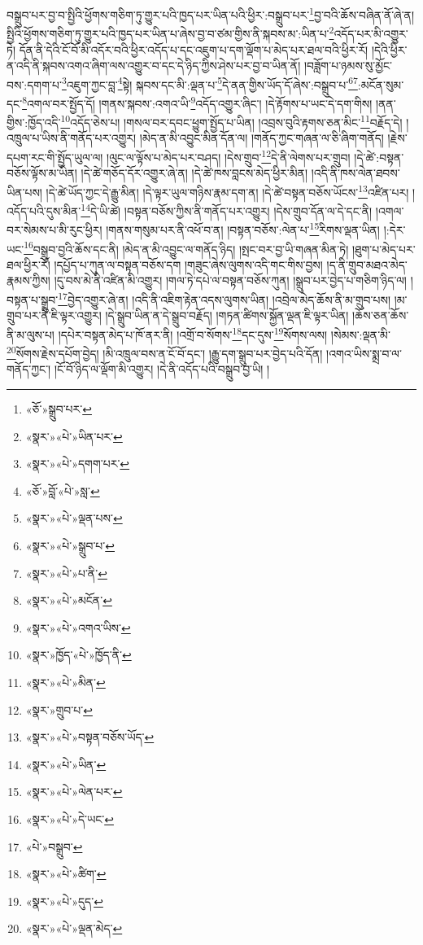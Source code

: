 བསྒྲུབ་པར་བྱ་བ་སྤྱིའི་ཕྱོགས་གཅིག་ཏུ་གྱུར་པའི་ཁྱད་པར་ཡིན་པའི་ཕྱིར་:བསྒྲུབ་པར་\footnote{«ཅོ་»སྒྲུབ་པར་}བྱ་བའི་ཆོས་བཞིན་ནོ་ཞེ་ན། སྤྱིའི་ཕྱོགས་གཅིག་ཏུ་གྱུར་པའི་ཁྱད་པར་ཡིན་པ་ཞེས་བྱ་བ་ཙམ་གྱིས་ནི་སྐབས་མ་:ཡིན་པ་\footnote{«སྣར་»«པེ་»ཡིན་པར་}འདོད་པར་མི་འགྱུར་ཏེ། དོན་ནི་དེའི་ངོ་བོ་མི་འདོར་བའི་ཕྱིར་འདོད་པ་དང་འཇུག་པ་དག་ལྡོག་པ་མེད་པར་ཐལ་བའི་ཕྱིར་རོ། །དེའི་ཕྱིར་ན་འདི་ནི་སྐབས་འགའ་ཞིག་ལས་འགྱུར་བ་དང་དེ་ཉིད་ཀྱིས་ཤེས་པར་བྱ་བ་ཡིན་ནོ། །བཟློག་པ་ཉམས་སུ་མྱོང་བས་:དགག་པ་\footnote{«སྣར་»«པེ་»དགག་པར་}འཇུག་ཀྱང་བླ་\footnote{«ཅོ་»བློ་«པེ་»སླ་}སྟེ། སྐབས་དང་མི་:ལྡན་པ་\footnote{«སྣར་»«པེ་»ལྡན་པས་}དེ་ནན་གྱིས་ཡོད་དོ་ཞེས་:བསྒྲུབ་པ་\footnote{«སྣར་»«པེ་»སྒྲུབ་པ་}\footnote{«སྣར་»«པེ་»པ་ནི་}:མངོན་སུམ་དང་\footnote{«སྣར་»«པེ་»མངོན་}འགལ་བར་སྤྱོད་དོ། །གནས་སྐབས་:འགའ་ཡི་\footnote{«སྣར་»«པེ་»འགའ་ཡིས་}འདོད་འགྱུར་ཞིང་། །དེ་རྟོགས་པ་ཡང་དེ་དག་གིས། །ནན་གྱིས་:ཁྱོད་འདི་\footnote{«སྣར་»ཁྱོད་«པེ་»ཁྱོད་ནི་}འདོད་ཅེས་པ། །གསལ་བར་དབང་ཕྱུག་སྤྱོད་པ་ཡིན། །འབྲས་བུའི་རྟགས་ཅན་མིང་\footnote{«སྣར་»«པེ་»མིན་}བརྗོད་དེ། །འཁྲུལ་པ་ཡིས་ནི་གནོད་པར་འགྱུར། །མེད་ན་མི་འབྱུང་མིན་དོན་ལ། །གནོད་ཀྱང་གཞན་ལ་ཅི་ཞིག་གནོད། །རྗེས་དཔག་རང་གི་སྤྱོད་ཡུལ་ལ། །ལུང་ལ་ལྟོས་པ་མེད་པར་བཤད། །དེས་གྲུབ་\footnote{«སྣར་»གྲུབ་པ་}དེ་ནི་ལེགས་པར་གྲུབ། །དེ་ཚེ་:བསྟན་བཅོས་ལྟོས་མ་ཡིན། །དེ་ཚེ་གཅོད་དོར་འགྱུར་ཞེ་ན། །དེ་ཚེ་ཁས་བླངས་མེད་ཕྱིར་མིན། །འདི་ནི་ཁས་ལེན་ཐབས་ཡིན་པས། །དེ་ཚེ་ཡོད་ཀྱང་དེ་རྒྱུ་མིན། །དེ་ལྟར་ཡུལ་གཉིས་རྣམ་དག་ན། །དེ་ཚེ་བསྟན་བཅོས་ཡོངས་\footnote{«སྣར་»«པེ་»བསྟན་བཅོས་ཡོད་}འཛིན་པར། །འདོད་པའི་དུས་མིན་\footnote{«སྣར་»«པེ་»ཡིན་}དེ་ཡི་ཚེ། །བསྟན་བཅོས་ཀྱིས་ནི་གནོད་པར་འགྱུར། །དེས་གྲུབ་དོན་ལ་དེ་དང་ནི། །འགལ་བར་སེམས་པ་མི་རུང་ཕྱིར། །གནས་གསུམ་པར་ནི་འཕོ་བ་ན། །བསྟན་བཅོས་:ལེན་པ་\footnote{«སྣར་»«པེ་»ལེན་པར་}རིགས་ལྡན་ཡིན། །:དེར་ཡང་\footnote{«སྣར་»«པེ་»དེ་ཡང་}བསྒྲུབ་བྱའི་ཆོས་དང་ནི། །མེད་ན་མི་འབྱུང་ལ་གནོད་ཉིད། །སྤང་བར་བྱ་ཡི་གཞན་མིན་ཏེ། །ཐུག་པ་མེད་པར་ཐལ་ཕྱིར་རོ། །དཔྱོད་པ་ཀུན་ལ་བསྟན་བཅོས་དག །གཟུང་ཞེས་ལུགས་འདི་གང་གིས་བྱས། །ད་ནི་གྲུབ་མཐའ་མེད་རྣམས་ཀྱིས། །དུ་བས་མེ་ནི་འཛིན་མི་འགྱུར། །གལ་ཏེ་དཔེ་ལ་བསྟན་བཅོས་ཀུན། །སྒྲུབ་པར་བྱེད་པ་གཅིག་ཉིད་ལ། །བསྟན་པ་སྒྲུབ་\footnote{«པེ་»བསྒྲུབ་}བྱེད་འགྱུར་ཞེ་ན། །འདི་ནི་འཇིག་རྟེན་འདས་ལུགས་ཡིན། །འབྲེལ་མེད་ཆོས་ནི་མ་གྲུབ་པས། །མ་གྲུབ་པར་ནི་ཇི་ལྟར་འགྱུར། །དེ་སྒྲུབ་ཡིན་ན་དེ་སྒྲུབ་བརྗོད། །གཏན་ཚིགས་སྐྱོན་ལྡན་ཇི་ལྟར་ཡིན། །ཆོས་ཅན་ཆོས་ནི་མ་ལུས་པ། །དཔེར་བསྟན་མེད་པ་ཁོ་ནར་ནི། །འགྲོ་བ་སོགས་\footnote{«སྣར་»«པེ་»ཚིག་}དང་དུས་\footnote{«སྣར་»«པེ་»དུད་}སོགས་ལས། །སེམས་:ལྡན་མི་\footnote{«སྣར་»«པེ་»ལྡན་མེད་}སོགས་རྗེས་དཔོག་བྱེད། །མི་འཁྲུལ་བས་ན་ངོ་བོ་དང་། །རྒྱུ་དག་སྒྲུབ་པར་བྱེད་པའི་དོན། །འགའ་ཡིས་སྨྲ་བ་ལ་གནོད་ཀྱང་། །ངོ་བོ་ཉིད་ལ་ལྡོག་མི་འགྱུར། །དེ་ནི་འདོད་པའི་བསྒྲུབ་བྱ་ཡི། །

